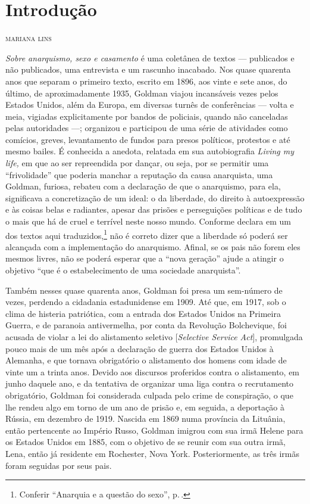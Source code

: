 \chapter{Introdução}

\begin{flushright}
\textsc{mariana lins}
\end{flushright}\bigskip

\noindent\emph{Sobre anarquismo, sexo e casamento} é uma coletânea de
textos --- publicados e não publicados, uma entrevista e um rascunho
inacabado. Nos quase quarenta anos que separam o primeiro texto, escrito em 1896, aos vinte e sete anos, do último, de
aproximadamente 1935, Goldman viajou incansáveis vezes pelos Estados
Unidos, além da Europa, em diversas turnês de conferências --- volta e
meia, vigiadas explicitamente por bandos de policiais, quando não
canceladas pelas autoridades ---; organizou e participou de uma série de
atividades como comícios, greves, levantamento de fundos para presos
políticos, protestos e até mesmo bailes. É conhecida a anedota, relatada
em sua autobiografia \emph{Living my life,} em que ao ser repreendida
por dançar, ou seja, por se permitir uma ``frivolidade'' que poderia
manchar a reputação da causa anarquista, uma Goldman, furiosa, rebateu
com a declaração de que o anarquismo, para ela, significava a
concretização de um ideal: o da liberdade, do direito à
autoexpressão e às coisas belas e radiantes, apesar das prisões e
perseguições políticas e de tudo o mais que há de cruel e terrível neste
nosso mundo. Conforme declara em um dos textos aqui traduzidos,\footnote{Conferir ``Anarquia e a questão do sexo'', p.\,\pageref{ref1}.}
não é correto dizer que a
liberdade só poderá ser alcançada com a implementação do anarquismo.
Afinal, se os pais não forem eles mesmos livres, não se poderá esperar
que a ``nova geração'' ajude a atingir o objetivo ``que é o
estabelecimento de uma sociedade anarquista''.

Também nesses quase quarenta anos, Goldman foi presa um sem-número de
vezes, perdendo a cidadania estadunidense em 1909. Até que, em 1917, sob
o clima de histeria patriótica, com a entrada dos Estados Unidos na
Primeira Guerra, e de paranoia antivermelha, por conta da Revolução
Bolchevique, foi acusada de violar a lei do alistamento seletivo
{[}\emph{Selective Service Act}{]}, promulgada pouco mais de um mês após
a declaração de guerra dos Estados Unidos à Alemanha, e que tornava
obrigatório o alistamento dos homens com idade de vinte um a trinta
anos. Devido aos discursos proferidos contra o alistamento, em junho
daquele ano, e da tentativa de organizar uma liga contra o recrutamento
obrigatório, Goldman foi considerada culpada pelo crime de conspiração,
o que lhe rendeu algo em torno de um ano de prisão e, em seguida, a
deportação à Rússia, em dezembro de 1919. Nascida em 1869 numa província da
Lituânia, então pertencente ao Império Russo, Goldman imigrou
com sua irmã Helene para os Estados Unidos em 1885, com o objetivo de
se reunir com sua outra irmã, Lena, então já residente em Rochester,
Nova York. Posteriormente, as três irmãs foram seguidas por seus pais.

